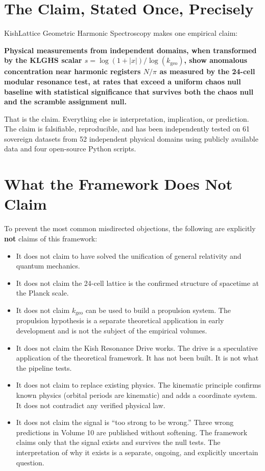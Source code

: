 \documentclass[11pt, letterpaper, openany]{book}
\begin{document}
\section{The Claim, Stated Once, Precisely}

KishLattice Geometric Harmonic Spectroscopy makes one empirical claim:

\textbf{Physical measurements from independent domains, when transformed
by the KLGHS scalar $s = \log(1 + |x|) / \log(k_\text{geo})$, show
anomalous concentration near harmonic registers $N/\pi$ as measured by
the 24-cell modular resonance test, at rates that exceed a uniform
chaos null baseline with statistical significance that survives both
the chaos null and the scramble assignment null.}

That is the claim. Everything else is interpretation, implication, or
prediction. The claim is falsifiable, reproducible, and has been
independently tested on 61 sovereign datasets from 52 independent
physical domains using publicly available data and four open-source
Python scripts.

\section{What the Framework Does Not Claim}

To prevent the most common misdirected objections, the following
are explicitly \textbf{not} claims of this framework:

\begin{itemize}
    \item It does not claim to have solved the unification of
    general relativity and quantum mechanics.
    \item It does not claim the 24-cell lattice is the
    confirmed structure of spacetime at the Planck scale.
    \item It does not claim $k_\text{geo}$ can be used to
    build a propulsion system. The propulsion hypothesis is a
    separate theoretical application in early development and
    is not the subject of the empirical volumes.
    \item It does not claim the Kish Resonance Drive works.
    The drive is a speculative application of the theoretical
    framework. It has not been built. It is not what the
    pipeline tests.
    \item It does not claim to replace existing physics. The
    kinematic principle confirms known physics (orbital periods
    are kinematic) and adds a coordinate system. It does not
    contradict any verified physical law.
    \item It does not claim the signal is ``too strong to be wrong.''
    Three wrong predictions in Volume 10 are published without
    softening. The framework claims only that the signal exists
    and survives the null tests. The interpretation of why it
    exists is a separate, ongoing, and explicitly uncertain question.
\end{itemize}
\end{document}
